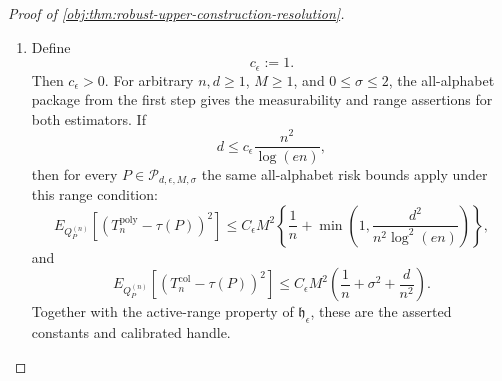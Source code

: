 \documentclass[11pt]{article}
\begin{document}
\begin{proof}[Proof of \cref{obj:thm:robust-upper-construction-resolution}]
\begin{enumerate}
Set
\[
C_\epsilon:=\max\{C_{\mathrm{poly},\epsilon},
                 C_{\mathrm{col},\epsilon}\}.
\]
Then \(C_\epsilon>0\).  The two displayed rate factors are nonnegative for
\(n,d\ge1\) and \(0\le\sigma\le2\), and \(M^2\ge0\); hence replacing
\(C_{\mathrm{poly},\epsilon}\) and \(C_{\mathrm{col},\epsilon}\) by
\(C_\epsilon\) preserves the two upper bounds. %

\item Define
\[
c_\epsilon:=1.
\]
Then \(c_\epsilon>0\).  For arbitrary \(n,d\ge1\), \(M\ge1\), and
\(0\le\sigma\le2\), the all-alphabet package from the first step gives the
measurability and range assertions for both estimators.  If
\[
d\le c_\epsilon\frac{n^2}{\log(en)},
\]
then for every \(P\in\mathcal P_{d,\epsilon,M,\sigma}\) the same all-alphabet
risk bounds apply under this range condition:
\[
E_{Q_P^{(n)}}\!\left[
\left(T_n^{\mathrm{poly}}-\tau(P)\right)^2
\right]
\le
C_\epsilon M^2
\left\{
\frac1n+
\min\left(1,\frac{d^2}{n^2\log^2(en)}\right)
\right\},
\]
and
\[
E_{Q_P^{(n)}}\!\left[
\left(T_n^{\mathrm{col}}-\tau(P)\right)^2
\right]
\le
C_\epsilon M^2
\left(
\frac1n+\sigma^2+\frac{d}{n^2}
\right).
\]
Together with the active-range property of \(\mathfrak h_\epsilon\), these are
the asserted constants and calibrated handle. %
\end{enumerate}
\end{proof}
\end{document}

